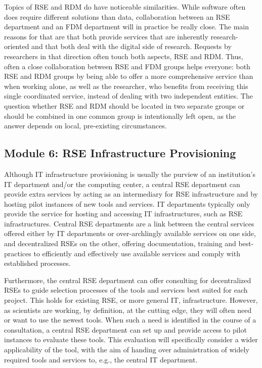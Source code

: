 \documentclass[a4paper]{article}
\begin{document}
Topics of RSE and RDM do have noticeable similarities.
While software often does require different solutions than data, collaboration between an RSE department and an FDM department will in practice be really close.
The main reasons for that are that both provide services that are inherently research-oriented and that both deal with the digital side of research.
Requests by researchers in that direction often touch both aspects, RSE and RDM.
Thus, often a close collaboration between RSE and FDM groups helps everyone: both RSE and RDM groups by being able to offer a more comprehensive service than when working alone, as well as the researcher, who benefits from receiving this single coordinated service, instead of dealing with two independent entities.
The question whether RSE and RDM should be located in two separate groups or should be combined in one common group is intentionally left open, as the answer depends on local, pre-existing circumstances.

\subsection{Module 6: RSE Infrastructure Provisioning}
\label{sec:infrastructure}

Although IT infrastructure provisioning is usually the purview of an institution's IT department and/or the computing center,
a central RSE department can provide extra services by acting as an intermediary for RSE infrastructure and by hosting pilot instances of new tools and services.
IT departments typically only provide the service for hosting and accessing IT infrastructures, such as RSE infrastructures.
Central RSE departments are a link between the central services offered either by IT departments or over-archlingly available services on one side,
and decentralized RSEs on the other, offering documentation, training and best-practices to efficiently and effectively use available services and comply with established processes.

Furthermore, the central RSE department can offer consulting for decentralized RSEs to guide selection processes of the tools and services best suited for each project.
This holds for existing RSE, or more general IT, infrastructure.
However, as scientists are working, by definition, at the cutting edge, they will often need or want to use the newest tools.
When such a need is identified in the course of a consultation, a central RSE department can set up and provide access to pilot instances to evaluate these tools.
This evaluation will specifically consider a wider applicability of the tool, with the aim of handing over administration of widely required tools and services to, e.g., the central IT department.
\end{document}
